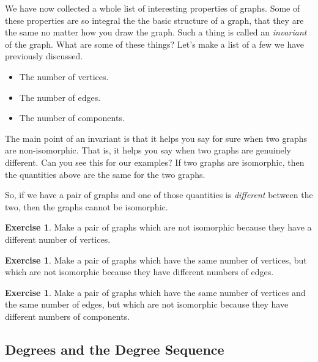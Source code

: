 \documentclass[12pt,letterpaper]{article}
\theoremstyle{definition}
\newtheorem{exercise}[question]{Exercise}
\begin{document}
We have now collected a whole list of interesting properties of graphs. Some of these properties are so integral
the the basic structure of a graph, that they are the same no matter how you draw the graph. Such a thing is
called an \emph{invariant} of the graph. What are some of these things? Let's make a list of a few we have previously discussed.
\begin{itemize}
\item The number of vertices.
\item The number of edges.
\item The number of components.
\end{itemize}

The main point of an invariant is that it helps you say for sure when two graphs are non-isomorphic. That is, it helps you say when two graphs are genuinely different. Can you see this for our examples? If two graphs are isomorphic, then the quantities above are the same for the two graphs.

So, if we have a pair of graphs and one of those quantities is \textit{different} between the two, then the graphs
cannot be isomorphic.

\begin{exercise}
Make a pair of graphs which are not isomorphic because they have a different number of vertices.
\end{exercise}

\begin{exercise}
Make a pair of graphs which have the same number of vertices, but which are not isomorphic because they 
have different numbers of edges.
\end{exercise}

\begin{exercise}
Make a pair of graphs which have the same number of vertices and the same number of edges, but which are 
not isomorphic because they have different numbers of components.
\end{exercise}

\subsection*{Degrees and the Degree Sequence}
\end{document}
